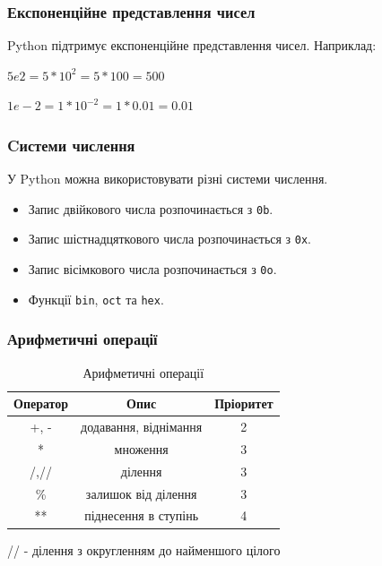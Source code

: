 \begin{frame}
\frametitle{Експоненційне представлення чисел}
Python підтримує експоненційне представлення чисел. Наприклад:

\LARGE{
$5e2 = 5\ast 10^2 = 5\ast 100 = 500$

$1e-2 = 1\ast 10^{-2} = 1\ast 0.01 = 0.01$  
}
\end{frame}

\begin{frame}
\frametitle{Cистеми числення}
У Python можна використовувати різні системи числення. 
\begin{itemize}
\item Запис двійкового числа розпочинається з \texttt{0b}.
\item Запис шістнадцяткового числа розпочинається з \texttt{0x}.
\item Запис вісімкового числа розпочинається з \texttt{0o}. 
\item Функції \texttt{bin}, \texttt{oct} та \texttt{hex}.
\end{itemize}
\end{frame}


 
\begin{frame}
\frametitle{Арифметичні операції}

\begin{table}
  \caption{Арифметичні операції}
  \label{tab:}

  \begin{center}
    \begin{tabular}{|c|c|c|}
      \hline
      \textbf{Оператор} & \textbf{Опис} & \textbf{Пріоритет} \\
      \hline
      +, - & додавання, віднімання & 2 \\
       \hline
      * & множення & 3 \\
       \hline
       /,// & ділення & 3 \\
       \hline
       \% & залишок від ділення & 3 \\
       \hline
       ** & піднесення в ступінь & 4 \\
       \hline
    \end{tabular}
  \end{center}
\end{table}
 \begin{center}
   \tiny{// - ділення з округленням до найменшого цілого}
  \end{center}
\end{frame}

